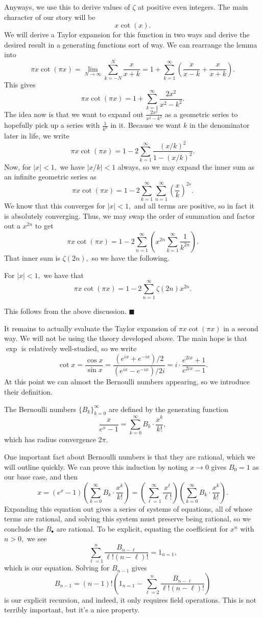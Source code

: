 Anyways, we use this to derive values of $\zeta$ at positive even integers. The main character of our story will be
\[x\cot(x).\]
We will derive a Taylor expansion for this function in two ways and derive the desired result in a generating functions sort of way. We can rearrange the lemma into
\[\pi x\cot(\pi x)=\lim_{N\to\infty}\sum_{k=-N}^N\frac x{x+k}=1+\sum_{k=1}^\infty\left(\frac x{x-k}+\frac x{x+k}\right).\]
This gives
\[\pi x\cot(\pi x)=1+\sum_{k=1}^\infty\frac{2x^2}{x^2-k^2}.\]
The idea now is that we want to expand out $\frac{2x^2}{x^2-k^2}$ as a geometric series to hopefully pick up a series with $\frac1{k^n}$ in it. Because we want $k$ in the denominator later in life, we write
\[\pi x\cot(\pi x)=1-2\sum_{k=1}^\infty\frac{(x/k)^2}{1-(x/k)^2}.\]
Now, for $|x|<1,$ we have $|x/k|<1$ always, so we may expand the inner sum as an infinite geometric series as
\[\pi x\cot(\pi x)=1-2\sum_{k=1}^\infty\sum_{n=1}^\infty\left(\frac xk\right)^{2s}.\]
We know that this converges for $|x|<1,$ and all terms are positive, so in fact it is absolutely converging. Thus, we may swap the order of summation and factor out a $x^{2n}$ to get
\[\pi x\cot(\pi x)=1-2\sum_{n=1}^\infty\left(x^{2n}\sum_{k=1}^\infty\frac1{k^{2n}}\right).\]
That inner sum is $\zeta(2n),$ so we have the following.
\begin{lemma}
    For $|x|<1,$ we have that
    \[\pi x\cot(\pi x)=1-2\sum_{n=1}^\infty\zeta(2n)x^{2n}.\]
\end{lemma}
This follows from the above discussion. $\blacksquare$

It remains to actually evaluate the Taylor expansion of $\pi x\cot(\pi x)$ in a second way. We will not be using the theory developed above. The main hope is that $\exp$ is relatively well-studied, so we write
\[\cot x=\frac{\cos x}{\sin x}=\frac{\left(e^{ix}+e^{-ix}\right)/2}{\left(e^{ix}-e^{-ix}\right)/2i}=i\cdot\frac{e^{2ix}+1}{e^{2ix}-1}.\]
At this point we can almost the Bernoulli numbers appearing, so we introduce their definition.
\begin{definition}
    The Bernoulli numbers $\{B_k\}_{k=0}^\infty$ are defined by the generating function
    \[\frac x{e^x-1}=\sum_{k=0}^\infty B_k\cdot\frac{x^k}{k!},\]
    which has radius convergence $2\pi.$
\end{definition}
One important fact about Bernoulli numbers is that they are rational, which we will outline quickly. We can prove this induction by noting $x\to0$ gives $B_0=1$ as our base case, and then
\[x=\left(e^x-1\right)\left(\sum_{k=0}^\infty B_k\cdot\frac{x^k}{k!}\right)=\left(\sum_{\ell=1}^{\infty}\frac{x^\ell}{\ell!}\right)\left(\sum_{k=0}^\infty B_k\cdot\frac{x^k}{k!}\right).\]
Expanding this equation out gives a series of systems of equations, all of whose terms are rational, and solving this system must preserve being rational, so we conclude the $B_\bullet$ are rational. To be explicit, equating the coefficient for $x^n$ with $n>0,$ we see
\[\sum_{\ell=1}^n\frac{B_{n-\ell}}{\ell!(n-\ell)!}=1_{n=1},\]
which is our equation. Solving for $B_{n-1}$ gives
\[B_{n-1}=(n-1)!\left(1_{n=1}-\sum_{\ell=2}^n\frac{B_{n-\ell}}{\ell!(n-\ell)!}\right)\]
is our explicit recursion, and indeed, it only requires field operations. This is not terribly important, but it's a nice property.

